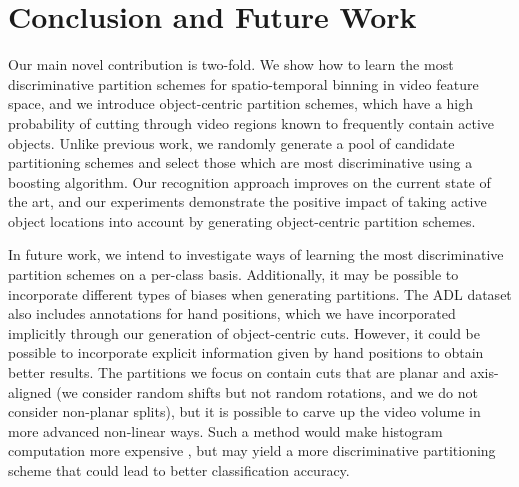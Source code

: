 \documentclass{bmvc2k}
\begin{document}
	
\section{Conclusion and Future Work}
	Our main novel contribution is two-fold. We show how to learn the most
  discriminative partition schemes for spatio-temporal binning in video feature space, and
  we introduce object-centric partition schemes, which have a high
  probability of cutting through video regions known to frequently contain
  active objects. Unlike previous work, we randomly generate a pool of
  candidate partitioning schemes and select those which are most
  discriminative using a boosting algorithm.
  Our recognition approach improves on the current state of the art, and our
  experiments demonstrate the positive impact of taking active object
  locations into account by generating object-centric partition schemes.
  
  In future work, we intend to investigate ways of learning the most
  discriminative partition schemes on a per-class basis.
	Additionally, it may be possible to incorporate different types of biases when generating
	partitions. The ADL dataset also includes annotations for hand positions,
	which we have incorporated implicitly through our generation of
  object-centric cuts.
	However,
	it could be possible to incorporate explicit information given by hand
	positions to obtain better results.
	The partitions we focus on contain cuts that are
  planar and axis-aligned (we consider random shifts but not random
  rotations, and we do not consider non-planar splits),
  but it is possible to carve up the
	video volume in more advanced non-linear ways. Such a method would 
  make histogram computation more expensive	, but may yield a more discriminative
	partitioning scheme that could lead to better classification accuracy.

\end{document}
